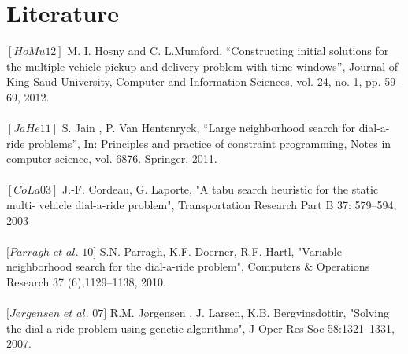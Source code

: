 \documentclass[fleqn]{scrartcl}
\begin{document}
\newpage
\section{Literature}
$[HoMu 12]$ M. I. Hosny and C. L.Mumford, “Constructing initial solutions for the multiple vehicle pickup and delivery problem with time windows”, Journal of King Saud University, Computer and Information Sciences, vol. 24, no. 1, pp. 59–69, 2012.
\\
\\
$[JaHe 11]$ S. Jain , P. Van Hentenryck, “Large neighborhood search for dial-a-ride problems”, In: Principles and practice of constraint programming, Notes in computer science, vol. 6876. Springer, 2011.
\\
\\
$[CoLa 03]$ J.-F. Cordeau, G. Laporte, "A tabu search heuristic for the static multi- vehicle dial-a-ride problem", Transportation Research Part B 37: 579–594, 2003
\\
\\
$[Parragh$  $et$  $al.$ $10]$ S.N. Parragh, K.F. Doerner, R.F. Hartl, "Variable neighborhood search for the dial-a-ride problem", Computers \& Operations Research 37 (6),1129–1138, 2010. 
\\
\\
$[Jørgensen$ $et$ $al.$ $07]$ R.M. Jørgensen , J. Larsen, K.B. Bergvinsdottir, "Solving the dial-a-ride problem using genetic algorithms", J Oper Res Soc 58:1321–1331, 2007.
\end{document}
